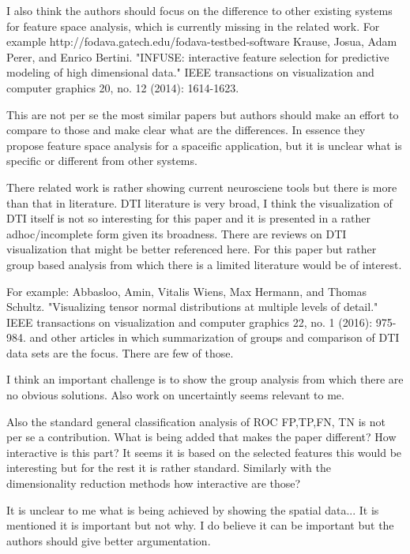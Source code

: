     I also think the authors should focus on the difference to other existing systems
    for feature space analysis, which is currently missing in the related work.
    For example http://fodava.gatech.edu/fodava-testbed-software 
    Krause, Josua, Adam Perer, and Enrico Bertini. "INFUSE: interactive feature
    selection for predictive modeling of high dimensional data." IEEE transactions on
    visualization and computer graphics 20, no. 12 (2014): 1614-1623.

    This are not per se the most similar papers but authors should make an effort to
    compare to those and make clear what are the differences. In essence they propose
    feature space analysis for a spaceific application, but it is unclear what is
    specific or different from other systems.

    There related work is rather showing current neurosciene tools but there is more
    than that in literature.
    DTI literature is very broad, I think the visualization of DTI itself is not so
    interesting for this paper and it is presented in a rather adhoc/incomplete form
    given its broadness. There are reviews on DTI visualization that might be better
    referenced here. For this paper but rather group based analysis from which there
    is a limited literature would be of interest.

    For example:
    Abbasloo, Amin, Vitalis Wiens, Max Hermann, and Thomas Schultz. "Visualizing
    tensor normal distributions at multiple levels of detail." IEEE transactions on
    visualization and computer graphics 22, no. 1 (2016): 975-984.
    and other articles in which summarization of groups and comparison of DTI data
    sets are the focus. There are few of those.

    I think an important challenge is to show the group analysis from which there are
    no obvious solutions. Also work on uncertaintly seems relevant to me.

    Also the standard general classification analysis of ROC FP,TP,FN, TN is not per
    se a contribution. What is being added that makes the paper different?
    How interactive is this part? It seems it is based on the selected features this
    would be interesting but for the rest it is rather standard.
    Similarly with the dimensionality reduction methods how interactive are those?

    It is unclear to me what is being achieved by showing the spatial data... It is
    mentioned it is important but not why.  I do believe it can be important but the
    authors should give better argumentation.

